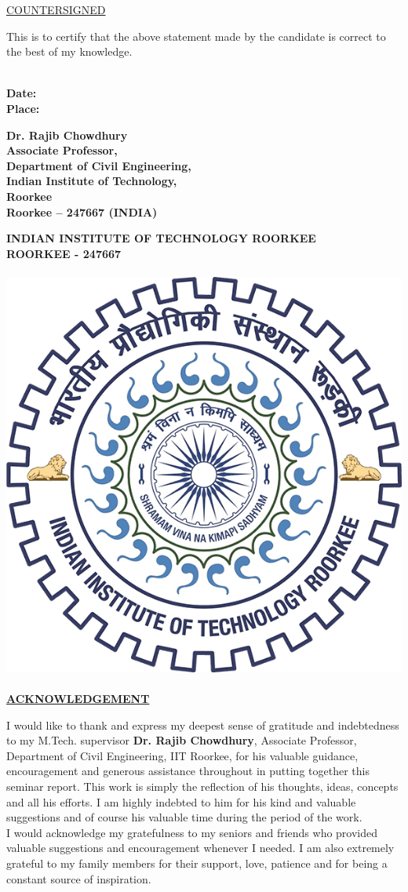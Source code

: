 \documentclass[12pt]{article}
\begin{document}
{\begin{center}
    \LARGE \underline{COUNTERSIGNED}\\
\end{center}
This is to certify that the above statement made by the candidate is correct to the best of my
knowledge.\\~\\
\begin{minipage}[t]{5cm}\bf
    \flushleft
    Date:\\Place:\\
    \end{minipage}
    \hfill
    \begin{minipage}[t]{10cm}\bf
    \flushright
    Dr. Rajib Chowdhury
\\Associate Professor,
\\Department of Civil Engineering,
\\Indian Institute of Technology,
\\Roorkee
\\Roorkee – 247667 (INDIA)\\
    \end{minipage}

\pagebreak
\begin{center}
    \textbf{ \LARGE   INDIAN INSTITUTE OF TECHNOLOGY ROORKEE\\
    ROORKEE - 247667\\~\\
    \includegraphics[width=.3\textwidth]{iitr.png}\\~\\
    \underline{ACKNOWLEDGEMENT}\\}
    \end{center}
    \begin{doublespace}
        {\large I would like to thank and express my deepest sense of gratitude and indebtedness to my M.Tech.
        supervisor \textbf{Dr. Rajib Chowdhury}, Associate Professor, Department of Civil Engineering, IIT
        Roorkee, for his valuable guidance, encouragement and generous assistance throughout in
        putting together this seminar report. This work is simply the reflection of his thoughts, ideas,
        concepts and all his efforts. I am highly indebted to him for his kind and valuable suggestions
        and of course his valuable time during the period of the work.\\
        I would acknowledge my gratefulness to my seniors and friends who provided valuable
        suggestions and encouragement whenever I needed. I am also extremely grateful to my family
        members for their support, love, patience and for being a constant source of inspiration.\\~\\
        }    
    \end{doublespace}

}
\end{document}
